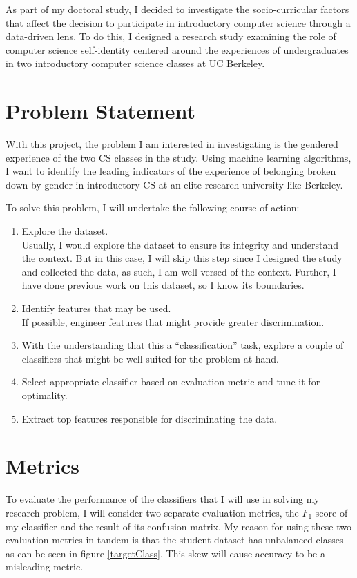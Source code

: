 As part of my doctoral study, I decided to investigate the socio-curricular factors that affect the decision to participate in introductory computer science through a data-driven lens. To do this, I designed a research study examining the role of computer science self-identity centered around the experiences of undergraduates in two introductory computer science classes at UC Berkeley. 


\section*{Problem Statement}

With this project, the problem I am interested in investigating is the gendered experience of the two CS classes in the study. Using machine learning algorithms, I want to identify the leading indicators of the experience of belonging broken down by gender in introductory CS at an elite research university like Berkeley.

To solve this problem, I will undertake the following course of action:
\begin{enumerate}%
\item Explore the dataset.\\
Usually, I would explore the dataset to ensure its integrity and understand the context. But in this case, I will skip this step since I designed the study and collected the data, as such, I am well versed of the context. Further, I have done previous work on this dataset, so I know its boundaries.
\item Identify features that may be used.\\ 
If possible, engineer features that might provide greater discrimination.
\item With the understanding that this a ``classification'' task, explore a couple of classifiers that might be well suited for the problem at hand.
\item Select appropriate classifier based on evaluation metric and tune it for optimality.
\item Extract top features responsible for discriminating the data.
\end{enumerate}

\section*{Metrics}


To evaluate the performance of the classifiers that I will use in solving my research problem, I will consider two separate evaluation metrics, the $F_1$ score of my classifier and the result of its confusion matrix. My reason for using these two evaluation metrics in tandem is that the student dataset has unbalanced classes as can be seen in figure \ref{targetClass}. This skew will cause accuracy to be a misleading metric.

